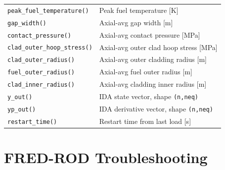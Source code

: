 \documentclass[11pt,a4paper]{article}
\begin{document}
\begin{center}
\begin{tabular}{ll}
\texttt{peak\_fuel\_temperature()}    & Peak fuel temperature [K] \\
\texttt{gap\_width()}                 & Axial-avg gap width [m] \\
\texttt{contact\_pressure()}          & Axial-avg contact pressure [MPa] \\
\texttt{clad\_outer\_hoop\_stress()}  & Axial-avg outer clad hoop stress [MPa] \\
\texttt{clad\_outer\_radius()}        & Axial-avg outer cladding radius [m] \\
\texttt{fuel\_outer\_radius()}        & Axial-avg fuel outer radius [m] \\
\texttt{clad\_inner\_radius()}        & Axial-avg cladding inner radius [m] \\
\texttt{y\_out()}                     & IDA state vector, shape \texttt{(n,neq)} \\
\texttt{yp\_out()}                    & IDA derivative vector, shape \texttt{(n,neq)} \\
\texttt{restart\_time()}              & Restart time from last load [s] \\
\bottomrule
\end{tabular}
\end{center}

\section{FRED-ROD Troubleshooting}
\label{sec:trouble-rod}
\end{document}
